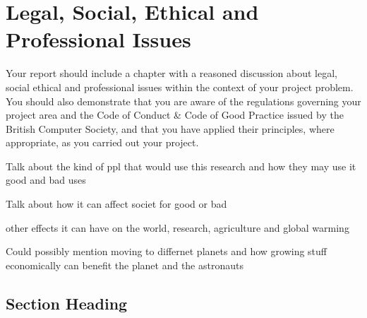 \chapter{Legal, Social, Ethical and Professional Issues}
Your report should include a chapter with a reasoned discussion about legal, social ethical and professional issues within the context of your project problem. You should also demonstrate that you are aware of the regulations governing your project area and the Code of Conduct \& Code of Good Practice issued by the British Computer Society, and that you have applied their principles, where appropriate, as you carried out your project.

Talk about the kind of ppl that would use this research and how they may use it
good and bad uses

Talk about how it can affect societ for good or bad

other effects it can have on the world, research, agriculture and global warming

Could possibly mention moving to differnet planets and how growing stuff economically can benefit the planet and the astronauts 

\section{Section Heading}
